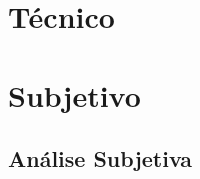 \documentclass[12pt,a4paper]{report}
\begin{document}
	



\pagestyle{plain}



\tableofcontents
\listoffigures

\newpage


\part{Técnico}











\part{Subjetivo}

\chapter{Análise Subjetiva}
\label{cap:analise_subjetiva}








\end{document}
